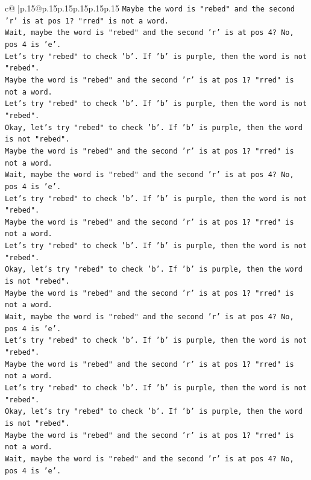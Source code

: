 \documentclass{article}
\begin{document}
{\begin{supertabular}{c@{$\;$}|p{.15\linewidth}@{}p{.15\linewidth}p{.15\linewidth}p{.15\linewidth}p{.15\linewidth}p{.15\linewidth}}
{{{\texttt{Maybe the word is "rebed" and the second 'r' is at pos 1? "rred" is not a word.} \\
\texttt{Wait, maybe the word is "rebed" and the second 'r' is at pos 4? No, pos 4 is 'e'.} \\
\texttt{Let's try "rebed" to check 'b'. If 'b' is purple, then the word is not "rebed".} \\
\texttt{Maybe the word is "rebed" and the second 'r' is at pos 1? "rred" is not a word.} \\
\texttt{Let's try "rebed" to check 'b'. If 'b' is purple, then the word is not "rebed".} \\
\texttt{Okay, let's try "rebed" to check 'b'. If 'b' is purple, then the word is not "rebed".} \\
\texttt{Maybe the word is "rebed" and the second 'r' is at pos 1? "rred" is not a word.} \\
\texttt{Wait, maybe the word is "rebed" and the second 'r' is at pos 4? No, pos 4 is 'e'.} \\
\texttt{Let's try "rebed" to check 'b'. If 'b' is purple, then the word is not "rebed".} \\
\texttt{Maybe the word is "rebed" and the second 'r' is at pos 1? "rred" is not a word.} \\
\texttt{Let's try "rebed" to check 'b'. If 'b' is purple, then the word is not "rebed".} \\
\texttt{Okay, let's try "rebed" to check 'b'. If 'b' is purple, then the word is not "rebed".} \\
\texttt{Maybe the word is "rebed" and the second 'r' is at pos 1? "rred" is not a word.} \\
\texttt{Wait, maybe the word is "rebed" and the second 'r' is at pos 4? No, pos 4 is 'e'.} \\
\texttt{Let's try "rebed" to check 'b'. If 'b' is purple, then the word is not "rebed".} \\
\texttt{Maybe the word is "rebed" and the second 'r' is at pos 1? "rred" is not a word.} \\
\texttt{Let's try "rebed" to check 'b'. If 'b' is purple, then the word is not "rebed".} \\
\texttt{Okay, let's try "rebed" to check 'b'. If 'b' is purple, then the word is not "rebed".} \\
\texttt{Maybe the word is "rebed" and the second 'r' is at pos 1? "rred" is not a word.} \\
\texttt{Wait, maybe the word is "rebed" and the second 'r' is at pos 4? No, pos 4 is 'e'.} \\
}}}
\end{supertabular}}
\end{document}
